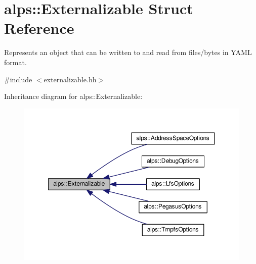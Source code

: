 \hypertarget{structalps_1_1Externalizable}{}\section{alps\+:\+:Externalizable Struct Reference}
\label{structalps_1_1Externalizable}


Represents an object that can be written to and read from files/bytes in Y\+A\+ML format.  




{\ttfamily \#include $<$externalizable.\+hh$>$}



Inheritance diagram for alps\+:\+:Externalizable\+:
\nopagebreak
\begin{figure}[H]
\begin{center}
\leavevmode
\includegraphics[width=350pt]{structalps_1_1Externalizable__inherit__graph}
\end{center}
\end{figure}
